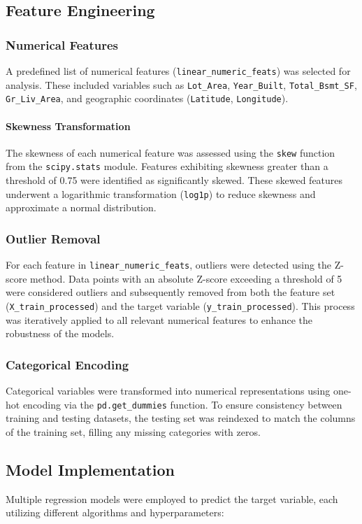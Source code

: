 \documentclass[11pt,a4paper]{article}
\begin{document}
\subsection{Feature Engineering}
\subsubsection{Numerical Features}
A predefined list of numerical features (\texttt{linear\_numeric\_feats}) was
selected for analysis. These included variables such as \texttt{Lot\_Area},
\texttt{Year\_Built}, \texttt{Total\_Bsmt\_SF}, \texttt{Gr\_Liv\_Area}, and
geographic coordinates (\texttt{Latitude}, \texttt{Longitude}).

\paragraph{Skewness Transformation}
The skewness of each numerical feature was assessed using the \texttt{skew}
function from the \texttt{scipy.stats} module. Features exhibiting skewness
greater than a threshold of 0.75 were identified as significantly skewed. These
skewed features underwent a logarithmic transformation (\texttt{log1p}) to
reduce skewness and approximate a normal distribution.

\subsubsection{Outlier Removal}
For each feature in \texttt{linear\_numeric\_feats}, outliers were detected
using the Z-score method. Data points with an absolute Z-score exceeding a
threshold of 5 were considered outliers and subsequently removed from both the
feature set (\texttt{X\_train\_processed}) and the target variable
(\texttt{y\_train\_processed}). This process was iteratively applied to all
relevant numerical features to enhance the robustness of the models.

\subsubsection{Categorical Encoding}
Categorical variables were transformed into numerical representations using
one-hot encoding via the \texttt{pd.get\_dummies} function. To ensure
consistency between training and testing datasets, the testing set was
reindexed to match the columns of the training set, filling any missing
categories with zeros.

\subsection{Model Implementation}
Multiple regression models were employed to predict the target variable, each
utilizing different algorithms and hyperparameters:
\end{document}
